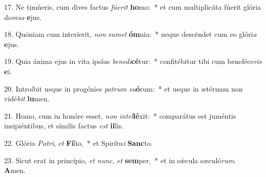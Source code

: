 17. Ne timúeris, cum dives factus \textit{fú}\textit{e}\textit{rit} \textbf{ho}mo:~*  et cum multiplicáta fúerit glória do\textit{mus} \textbf{e}jus.\

18. Quóniam cum interíerit, \textit{non} \textit{su}\textit{met} \textbf{óm}nia:~*  neque descéndet cum eo glóri\textit{a} \textbf{e}jus.\

19. Quia ánima ejus in vita ipsíus \textit{be}\textit{ne}\textit{di}\textbf{cé}tur:~*  confitébitur tibi cum beneféce\textit{ris} \textbf{e}i.\

20. Introíbit usque in progénies \textit{pa}\textit{trum} \textit{su}\textbf{ó}rum:~*  et usque in ætérnum non vidé\textit{bit} \textbf{lu}men.\

21. Homo, cum in honóre esset, \textit{non} \textit{in}\textit{tel}\textbf{lé}xit:~*  comparátus est juméntis insipiéntibus, et símilis factus \textit{est} \textbf{il}lis.\

22. Glória \textit{Pa}\textit{tri}, \textit{et} \textbf{Fí}lio,~*  et Spirítu\textit{i} \textbf{Sanc}to.\

23. Sicut erat in princípio, \textit{et} \textit{nunc}, \textit{et} \textbf{sem}per,~*  et in sǽcula sæculó\textit{rum}. \textbf{A}men.\


